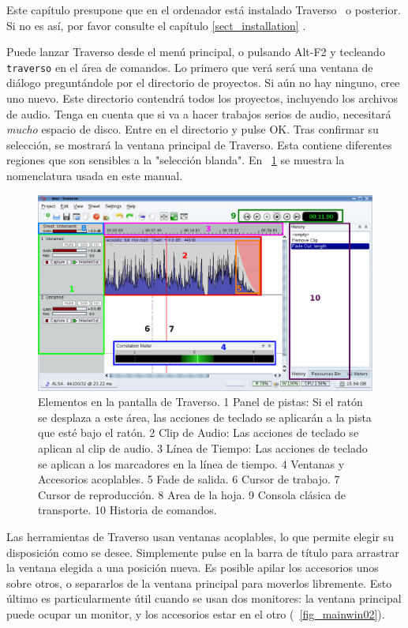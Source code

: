 ﻿Este capítulo presupone que en el ordenador está instalado Traverso \Version\ o posterior. Si no es así, por favor consulte el capítulo \ref{sect_installation} . 

Puede lanzar Traverso desde el menú principal, o pulsando Alt-F2 y tecleando \texttt{traverso} en el área de comandos. Lo primero que verá será una ventana de diálogo preguntándole por el directorio de proyectos. Si aún no hay ninguno, cree uno nuevo. Este directorio contendrá todos los proyectos, incluyendo los archivos de audio. Tenga en cuenta que si va a hacer trabajos serios de audio, necesitará \emph{mucho} espacio de disco. Entre en el directorio y pulse OK. Tras confirmar su selección, se mostrará la ventana principal de Traverso. Esta contiene diferentes regiones que son sensibles a la "selección blanda". En \FigT\ \ref{fig_gui01} se muestra la nomenclatura usada en este manual. 

\begin{figure}
 \centering\includegraphics[width=\textwidth]{../images/sshot06.png}
 \caption{Elementos en la pantalla de Traverso. 1 Panel de pistas: Si el ratón se desplaza a este área, las acciones de teclado se aplicarán a la pista que esté bajo el ratón. 2 Clip de Audio: Las acciones de teclado se aplican al clip de audio. 3 Línea de Tiempo: Las acciones de teclado se aplican a los marcadores en la línea de tiempo. 4 Ventanas y Accesorios acoplables. 5 Fade de salida. 6 Cursor de trabajo. 7 Cursor de reproducción. 8 Area de la hoja. 9 Consola clásica de transporte. 10 Historia de comandos.}
 \label{fig_gui01}
\end{figure}

Las herramientas de Traverso usan ventanas acoplables, lo que permite elegir su disposición como se desee. Simplemente pulse en la barra de título para arrastrar la ventana elegida a una posición nueva. Es posible apilar los accesorios unos sobre otros, o separarlos de la ventana principal para moverlos libremente. Esto último es particularmente útil cuando se usan dos monitores: la ventana principal puede ocupar un monitor, y los accesorios estar en el otro (\FigB\ \ref{fig_mainwin02}).

